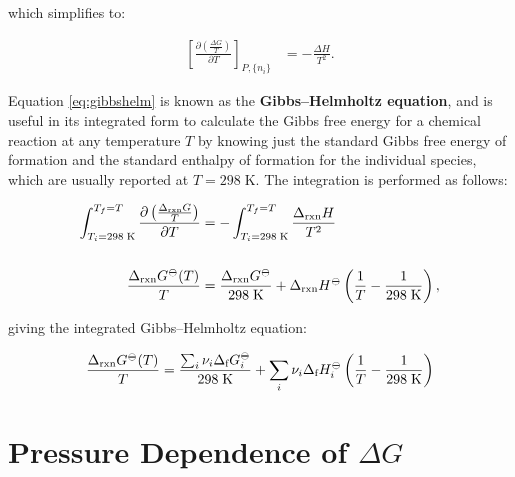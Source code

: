 \documentclass[
  9pt,
]{extbook}
\theoremstyle{definition}
\theoremstyle{definition}
\theoremstyle{definition}
\theoremstyle{definition}
\theoremstyle{remark}
\begin{document}
which simplifies to:

\begin{equation}
\begin{aligned}
\left[ \frac{\partial\left( \frac{\Delta G}{T} \right)}{\partial T} \right]_{P,\{n_i\}} &= - \frac{\Delta H}{T^2}.
\end{aligned}
\label{eq:gibbshelm}
\end{equation}

Equation \eqref{eq:gibbshelm} is known as the \textbf{Gibbs--Helmholtz equation}, and is useful in its integrated form to calculate the Gibbs free energy for a chemical reaction at any temperature \(T\) by knowing just the standard Gibbs free energy of formation and the standard enthalpy of formation for the individual species, which are usually reported at \(T=298\;\text{K}\). The integration is performed as follows:

\begin{equation}
\begin{aligned}
\int_{T_i=298 \;\text{K}}^{T_f=T}  \frac{\partial\left( \frac{\Delta_{\text{rxn}} G}{T} \right)}{\partial T} &=  - \int_{T_i=298 \;\text{K}}^{T_f=T}  \frac{\Delta_{\text{rxn}} H}{T^2} \\ \\ \frac{\Delta_{\text{rxn}} G^{-\kern-6pt{\ominus}\kern-6pt-}(T)}{T} &=  \frac{\Delta_{\text{rxn}} G^{-\kern-6pt{\ominus}\kern-6pt-}}{298 \;\text{K}} + \Delta_{\text{rxn}} H^{-\kern-6pt{\ominus}\kern-6pt-}\left( \frac{1}{T} -\frac{1}{298 \;\text{K}} \right),
\end{aligned}
\label{eq:gibbshelmIbase}
\end{equation}

giving the integrated Gibbs--Helmholtz equation:

\begin{equation}
\frac{\Delta_{\text{rxn}} G^{-\kern-6pt{\ominus}\kern-6pt-}(T)}{T} =  \frac{\sum_i \nu_i \Delta_{\text{f}} G_i^{-\kern-6pt{\ominus}\kern-6pt-}}{298 \;\text{K}} + \sum_i \nu_i \Delta_{\text{f}} H_i^{-\kern-6pt{\ominus}\kern-6pt-}\left( \frac{1}{T} -\frac{1}{298 \;\text{K}} \right)
\label{eq:gibbshelmI}
\end{equation}

\section{\texorpdfstring{Pressure Dependence of \(\Delta G\)}{Pressure Dependence of \textbackslash Delta G}}\label{pressure-dependence-of-delta-g}
\end{document}
